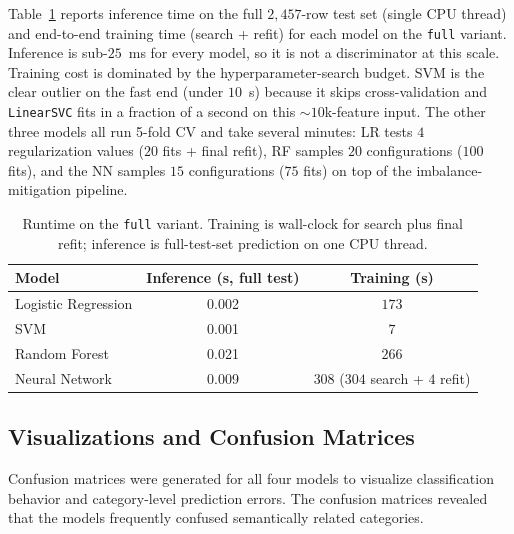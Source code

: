 \documentclass[11pt]{article}
\begin{document}
Table~\ref{tab:runtime} reports inference time on the full $2{,}457$-row
test set (single CPU thread) and end-to-end training time (search + refit)
for each model on the \texttt{full} variant. Inference is sub-$25$~ms for
every model, so it is not a discriminator at this scale. Training cost is
dominated by the hyperparameter-search budget. SVM is the clear outlier
on the fast end (under $10$~s) because it skips cross-validation and
\texttt{LinearSVC} fits in a fraction of a second on this
$\sim$$10$k-feature input. The other three models all run 5-fold CV and
take several minutes: LR tests $4$ regularization values ($20$ fits +
final refit), RF samples $20$ configurations ($100$ fits), and the NN
samples $15$ configurations ($75$ fits) on top of the imbalance-mitigation
pipeline.

\begin{table}[!htbp]
\centering
\caption{Runtime on the \texttt{full} variant. Training is wall-clock for
search plus final refit; inference is full-test-set prediction on one CPU
thread.}
\label{tab:runtime}
\begin{tabular}{lcc}
\toprule
Model & Inference (s, full test) & Training (s) \\
\midrule
Logistic Regression & 0.002 & $173$ \\
SVM                 & 0.001 & $7$ \\
Random Forest       & 0.021 & $266$ \\
Neural Network      & 0.009 & $308$ ($304$ search + $4$ refit) \\
\bottomrule
\end{tabular}
\end{table}

\subsection{Visualizations and Confusion Matrices}

Confusion matrices were generated for all four models to visualize
classification behavior and category-level prediction errors. The confusion
matrices revealed that the models frequently confused semantically related
categories.
\end{document}
